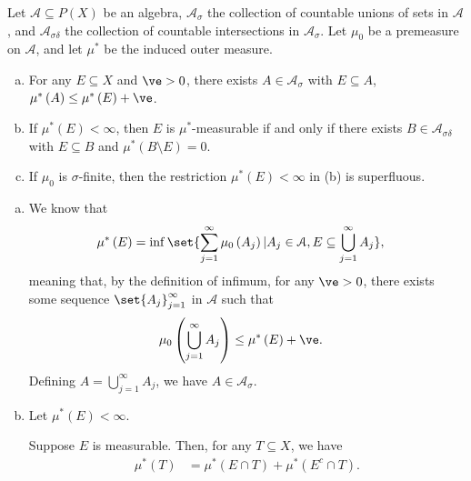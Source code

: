 \documentclass[10pt]{mypackage}
\begin{document}
\begin{exercise}[Exercise 18]
  Let $\mathcal{A}\subseteq P(X)$ be an algebra, $\mathcal{A}_{\sigma}$ the collection of countable unions of sets in $\mathcal{A}$, and $\mathcal{A}_{\sigma\delta}$ the collection of countable intersections in $\mathcal{A}_{\sigma}$. Let $\mu_0$ be a premeasure on $\mathcal{A}$, and let $\mu^{\ast}$ be the induced outer measure.
  \begin{enumerate}[(a)]
    \item For any $E\subseteq X$ and $\ve > 0$, there exists $A\in \mathcal{A}_{\sigma}$ with $E\subseteq A$, $\mu^{\ast}\left( A \right)\leq \mu^{\ast}\left( E \right) + \ve$.
    \item If $\mu^{\ast}\left( E \right) < \infty$, then $E$ is $\mu^{\ast}$-measurable if and only if there exists $B\in \mathcal{A}_{\sigma\delta}$ with $E\subseteq B$ and $\mu^{\ast}\left( B\setminus E \right) = 0$.
    \item If $\mu_0$ is $\sigma$-finite, then the restriction $\mu^{\ast}\left( E \right)< \infty$ in (b) is superfluous.
  \end{enumerate}
\end{exercise}
\begin{solution}\hfill
  \begin{enumerate}[(a)]
    \item We know that
      \begin{align*}
        \mu^{\ast}\left( E \right) &= \inf\set{\sum_{j=1}^{\infty}\mu_0\left( A_j \right) | A_j\in \mathcal{A},E\subseteq \bigcup_{j=1}^{\infty}A_j},
      \end{align*}
      meaning that, by the definition of infimum, for any $\ve > 0$, there exists some sequence $\set{A_j}_{j=1}^{\infty}$ in $\mathcal{A}$ such that
      \begin{align*}
        \mu_0\left( \bigcup_{j=1}^{\infty}A_j \right) &\leq \mu^{\ast}\left( E \right) + \ve.
      \end{align*}
      Defining $A = \bigcup_{j=1}^{\infty}A_j$, we have $A\in \mathcal{A}_{\sigma}$.
    \item Let $\mu^{\ast}\left( E \right) < \infty$.\newline

      Suppose $E$ is measurable. Then, for any $T\subseteq X$, we have
      \begin{align*}
        \mu^{\ast}\left( T \right) &= \mu^{\ast}\left( E\cap T \right) + \mu^{\ast}\left( E^{c}\cap T \right). 
      \end{align*}
  \end{enumerate}
\end{solution}
\end{document}
